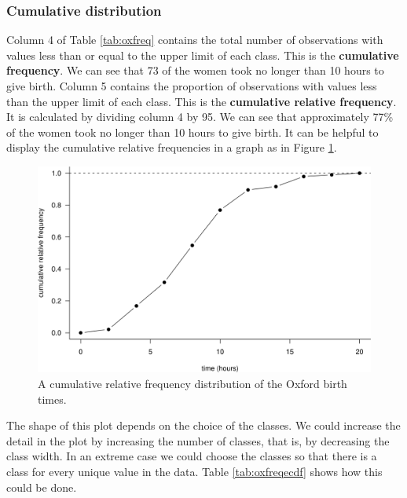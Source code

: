 \documentclass[
  11pt,
  british,
  openany, a4paper]{book}
\begin{document}
\hypertarget{cumulative-distribution}{%
\subsubsection*{Cumulative distribution}\label{cumulative-distribution}}

Column 4 of Table \ref{tab:oxfreq} contains the total number of observations with values less than or equal to the upper limit of each class. This is the \textbf{cumulative frequency}. We can see that 73 of the women took no longer than 10 hours to give birth. Column 5 contains the proportion of observations with values less than the upper limit of each class. This is the \textbf{cumulative relative frequency}. It is calculated by dividing column 4 by 95. We can see that approximately 77\% of the women took no longer than 10 hours to give birth. It can be helpful to display the cumulative relative frequencies in a graph as in Figure \ref{fig:oxcumfreq}.

\begin{figure}

{\centering \includegraphics[width=0.75\linewidth]{images/ox_cum_freq} 

}

\caption{A cumulative relative frequency distribution of the Oxford birth times.}\label{fig:oxcumfreq}
\end{figure}

The shape of this plot depends on the choice of the classes. We could increase the detail in the plot by increasing the number of classes, that is, by decreasing the class width. In an extreme case we could choose the classes so that there is a class for every unique value in the data. Table \ref{tab:oxfreqecdf} shows how this could be done.



 
  \providecommand{\huxb}[2]{\arrayrulecolor[RGB]{#1}\global\arrayrulewidth=#2pt}
  \providecommand{\huxvb}[2]{\color[RGB]{#1}\vrule width #2pt}
  \providecommand{\huxtpad}[1]{\rule{0pt}{#1}}
  \providecommand{\huxbpad}[1]{\rule[-#1]{0pt}{#1}}
\end{document}
